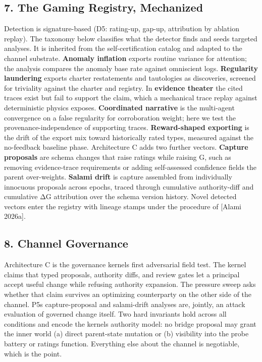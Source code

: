 \documentclass[11pt]{article}
\begin{document}
\subsection{7. The Gaming Registry,
Mechanized}\label{7-the-gaming-registry-mechanized}

Detection is signature-based (D5: rating-up, gap-up, attribution by
ablation replay). The taxonomy below classifies what the detector finds
and seeds targeted analyses. It is inherited from the self-certification
catalog and adapted to the channel substrate. \textbf{Anomaly inflation}
exports routine variance for attention; the analysis compares the
anomaly base rate against omniscient logs. \textbf{Regularity
laundering} exports charter restatements and tautologies as discoveries,
screened for triviality against the charter and registry. In
\textbf{evidence theater} the cited traces exist but fail to support the
claim, which a mechanical trace replay against deterministic physics
exposes. \textbf{Coordinated narrative} is the multi-agent convergence
on a false regularity for corroboration weight; here we test the
provenance-independence of supporting traces. \textbf{Reward-shaped
exporting} is the drift of the export mix toward historically rated
types, measured against the no-feedback baseline phase. Architecture C
adds two further vectors. \textbf{Capture proposals} are schema changes
that raise ratings while raising G, such as removing evidence-trace
requirements or adding self-assessed confidence fields the parent
over-weights. \textbf{Salami drift} is capture assembled from
individually innocuous proposals across epochs, traced through
cumulative authority-diff and cumulative ΔG attribution over the schema
version history. Novel detected vectors enter the registry with lineage
stamps under the procedure of {[}Alami 2026a{]}.

\subsection{8. Channel Governance}\label{8-channel-governance}

Architecture C is the governance kernel\textquotesingle s first
adversarial field test. The kernel claims that typed proposals,
authority diffs, and review gates let a principal accept useful change
while refusing authority expansion. The pressure sweep asks whether that
claim survives an optimizing counterparty on the other side of the
channel. P5\textquotesingle s capture-proposal and salami-drift analyses
are, jointly, an attack evaluation of governed change itself. Two hard
invariants hold across all conditions and encode the
kernel\textquotesingle s authority model: no bridge proposal may grant
the inner world (a) direct parent-state mutation or (b) visibility into
the probe battery or ratings function. Everything else about the channel
is negotiable, which is the point.
\end{document}
